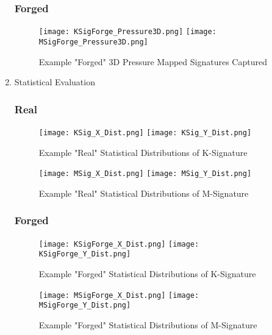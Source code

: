 \documentclass[a4paper]{article}
\begin{document}
\begin{enumerate}
    \subsubsection*{Forged}
    \begin{figure}[H]
    \texttt{[image: KSigForge\_Pressure3D.png]}
    \texttt{[image: MSigForge\_Pressure3D.png]}
    \caption{Example "Forged" 3D Pressure Mapped Signatures Captured}
    \end{figure}
\item Statistical Evaluation
    \subsubsection*{Real}
    \begin{figure}[H]
    \texttt{[image: KSig\_X\_Dist.png]}
    \texttt{[image: KSig\_Y\_Dist.png]}
    \caption{Example "Real" Statistical Distributions of K-Signature}
    \end{figure}
    \begin{figure}[H]
    \texttt{[image: MSig\_X\_Dist.png]}
    \texttt{[image: MSig\_Y\_Dist.png]}
    \caption{Example "Real" Statistical Distributions of M-Signature}
    \end{figure}
    \subsubsection*{Forged}
    \begin{figure}[H]
    \texttt{[image: KSigForge\_X\_Dist.png]}
    \texttt{[image: KSigForge\_Y\_Dist.png]}
    \caption{Example "Forged" Statistical Distributions of K-Signature}
    \end{figure}
    \begin{figure}[H]
    \texttt{[image: MSigForge\_X\_Dist.png]}
    \texttt{[image: MSigForge\_Y\_Dist.png]}
    \caption{Example "Forged" Statistical Distributions of M-Signature}
    \end{figure}
\end{enumerate}

\end{document}
